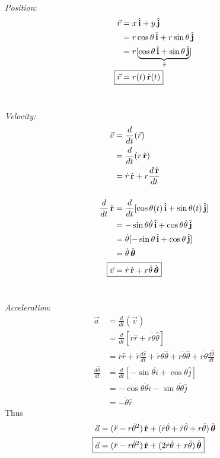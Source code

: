 \documentclass[10pt]{scrartcl}
\begin{document}
\begin{definition}~

\emph{Position}:
\[
\begin{aligned}
\vec{r} &= x\hat{i} + y\hat{j}\\
&= r\cos\theta\hat{i} + r\sin\theta\hat{j}\\
&= r[\underbrace{\cos\theta\hat{i} + \sin\theta\hat{j}}_{\hat{r}}]\\
\Aboxed{\vec{r} &= r(t)\hat{r}(t)}	
\end{aligned}
\]~

\emph{Velocity:}
\[
\begin{aligned}
  \vec{v} &= \frac{d}{dt}(\vec{r})\\
  &= \frac{d}{dt}(r\hat{r})\\
  &= \dot{r}\hat{r} + r\frac{d\hat{r}}{dt}\\[0.5cm]
  \frac{d}{dt}\hat{r} &= \frac{d}{dt}[\cos\theta(t)\hat{i} + \sin\theta(t)\hat{j}]\\
  &= -\sin\theta\dot{\theta}\hat{i} + \cos\theta\dot{\theta}\hat{j}\\
  &= \dot{\theta}[-\sin\theta\hat{i} + \cos\theta\hat{j}]\\
  &= \dot{\theta}\hat{\theta}\\
  \Aboxed{\vec{v} &= \dot{r}\hat{r} + r\dot{\theta}\hat{\theta}}
\end{aligned}
\]~

\emph{Acceleration}:
\[
\begin{aligned}
  \vec{a} &= \frac{d}{dt}(\vec{v})\\
  &= \frac{d}{dt}[\dot{r}\hat{r} + r\dot{\theta}\hat{\theta}]\\
  &= \ddot{r}\hat{r} + \dot{r}\frac{d\hat{r}}{dt} + \dot{r}\dot{\theta}\hat{\theta} + r\ddot{\theta}\hat{\theta} + r\dot{\theta}\frac{d\hat{\theta}}{dt}\\[0.5cm]
    \frac{d\hat{\theta}}{dt} &= \frac{d}{dt}[-\sin\theta\hat{i} + \cos\theta\hat{j}]\\
  &= -\cos\theta\dot{\theta}\hat{i} - \sin\theta\dot{\theta}\hat{j}\\
  &= -\dot{\theta}\hat{r}
\end{aligned}
\]
Thus
\[
\begin{aligned}
  \vec{a} &= (\ddot{r} - r\dot{\theta}^2)\hat{r} + (\dot{r}\dot{\theta} + \dot{r}\dot{\theta} + r\ddot{\theta})\hat{\theta} \\
 \Aboxed{\vec{a} &= (\ddot{r} - r\dot{\theta}^2)\hat{r} + (2\dot{r}\dot{\theta} + r\ddot{\theta})\hat{\theta}}
\end{aligned}
\]
\end{definition}\vsp
\end{document}
